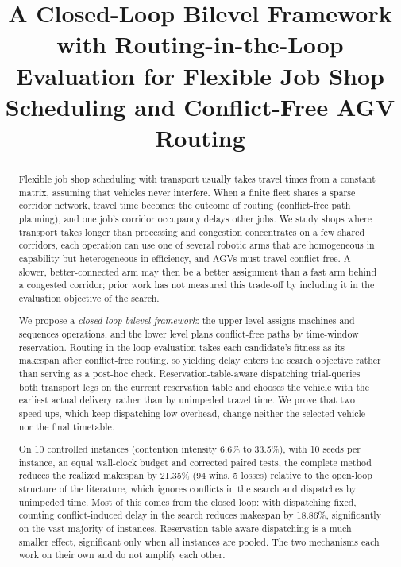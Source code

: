 \documentclass[manuscript,screen,review]{acmart}
\newcommand{\NCases}{10}
\newcommand{\NSeeds}{10}
\newcommand{\GainLoopRule}{18.86\%}      %
\newcommand{\GainProbeLoop}{2.45\%}      %
\newcommand{\GainEndToEnd}{21.35\%}      %
\newcommand{\WinEndToEnd}{94}
\newcommand{\LoseEndToEnd}{5}
\newcommand{\ContentionLo}{6.6\%}
\newcommand{\ContentionHi}{33.5\%}
\begin{document}
\title[Closed-Loop Bilevel Framework with Routing-in-the-Loop Evaluation]{A Closed-Loop Bilevel Framework with Routing-in-the-Loop Evaluation for Flexible Job Shop Scheduling and Conflict-Free AGV Routing}


\begin{abstract}
Flexible job shop scheduling with transport usually takes travel times from a constant matrix, assuming that vehicles never interfere.
When a finite fleet shares a sparse corridor network, travel time becomes the outcome of routing (conflict-free path planning), and one job's corridor occupancy delays other jobs.
We study shops where transport takes longer than processing and congestion concentrates on a few shared corridors, each operation can use one of several robotic arms that are homogeneous in capability but heterogeneous in efficiency, and AGVs must travel conflict-free.
A slower, better-connected arm may then be a better assignment than a fast arm behind a congested corridor; prior work has not measured this trade-off by including it in the evaluation objective of the search.

We propose a \emph{closed-loop bilevel framework}: the upper level assigns machines and sequences operations, and the lower level plans conflict-free paths by time-window reservation.
Routing-in-the-loop evaluation takes each candidate's fitness as its makespan after conflict-free routing, so yielding delay enters the search objective rather than serving as a post-hoc check.
Reservation-table-aware dispatching trial-queries both transport legs on the current reservation table and chooses the vehicle with the earliest actual delivery rather than by unimpeded travel time.
We prove that two speed-ups, which keep dispatching low-overhead, change neither the selected vehicle nor the final timetable.

On \NCases{} controlled instances (contention intensity \ContentionLo{} to \ContentionHi{}), with \NSeeds{} seeds per instance, an equal wall-clock budget and corrected paired tests, the complete method reduces the realized makespan by \GainEndToEnd{} (\WinEndToEnd{} wins, \LoseEndToEnd{} losses) relative to the open-loop structure of the literature, which ignores conflicts in the search and dispatches by unimpeded time.
Most of this comes from the closed loop: with dispatching fixed, counting conflict-induced delay in the search reduces makespan by \GainLoopRule{}, significantly on the vast majority of instances. Reservation-table-aware dispatching is a much smaller effect, significant only when all instances are pooled. The two mechanisms each work on their own and do not amplify each other.
\end{abstract}
\end{document}
